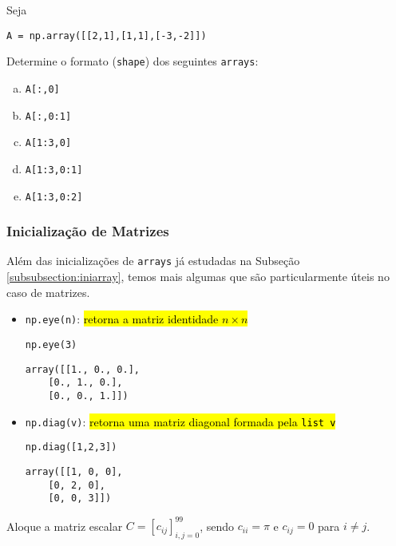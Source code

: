 \documentclass[a4paper,10pt,twoside]{article}
\begin{document}
\begin{exr}
  Seja

\begin{lstlisting}
A = np.array([[2,1],[1,1],[-3,-2]])
\end{lstlisting}

  Determine o formato (\texttt{shape}) dos seguintes \texttt{arrays}:
  \begin{enumerate}[a)]
  \item \texttt{A[:,0]}
  \item \texttt{A[:,0:1]}
  \item \texttt{A[1:3,0]}
  \item \texttt{A[1:3,0:1]}
  \item \texttt{A[1:3,0:2]}
  \end{enumerate}
\end{exr}

\subsubsection{Inicialização de Matrizes}

Além das inicializações de \texttt{arrays} já estudadas na Subseção \ref{subsubsection:iniarray}, temos mais algumas que são particularmente úteis no caso de matrizes.
\begin{itemize}
\item \texttt{np.eye(n)}: \hl{retorna a matriz identidade $n\times n$}

\begin{lstlisting}
np.eye(3)
\end{lstlisting}

\begin{verbatim}
array([[1., 0., 0.],
    [0., 1., 0.],
    [0., 0., 1.]])
\end{verbatim}

   \item \texttt{np.diag(v)}: \hl{retorna uma matriz diagonal formada pela \texttt{list v}}

\begin{lstlisting}
np.diag([1,2,3])
\end{lstlisting}

\begin{verbatim}
array([[1, 0, 0],
    [0, 2, 0],
    [0, 0, 3]])
\end{verbatim}

  \end{itemize}

 \begin{exr}
   Aloque a matriz escalar $C = [c_{ij}]_{i,j=0}^{99}$, sendo $c_{ii}=\pi$ e $c_{ij}=0$ para $i\neq j$.
 \end{exr}
\end{document}
